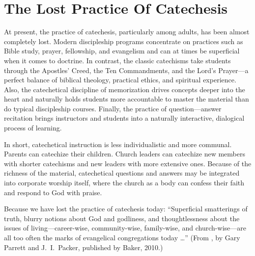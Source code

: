 \documentclass[]{memoir}
\begin{document}
\section{The Lost Practice Of Catechesis}
At present, the practice of catechesis, particularly among adults, has been almost completely lost. Modern discipleship programs concentrate on practices such as Bible study, prayer, fellowship, and evangelism and can at times be superficial when it comes to doctrine. In contrast, the classic catechisms take students through the Apostles' Creed, the Ten Commandments, and the Lord's Prayer\thinspace{}---\thinspace{}a perfect balance of biblical theology, practical ethics, and spiritual experience. Also, the catechetical discipline of memorization drives concepts deeper into the heart and naturally holds students more accountable to master the material than do typical discipleship courses. Finally, the practice of question\thinspace{}---\thinspace{}answer recitation brings instructors and students into a naturally interactive, dialogical process of learning.

In short, catechetical instruction is less individualistic and more communal. Parents can catechize their children. Church leaders can catechize new members with shorter catechisms and new leaders with more extensive ones. Because of the richness of the material, catechetical questions and answers may be integrated into corporate worship itself, where the church as a body can confess their faith and respond to God with praise.

Because we have lost the practice of catechesis today: ``Superficial smatterings of truth, blurry notions about God and godliness, and thoughtlessness about the issues of living\thinspace{}---\thinspace{}career-wise, community-wise, family-wise, and church-wise\thinspace{}---\thinspace{}are all too often the marks of evangelical congregations today {\dots}'' (From , by Gary Parrett and J.~I.\ Packer, published by Baker, 2010.)
\end{document}
